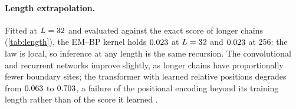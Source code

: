 \paragraph{Length extrapolation.}
Fitted at $L=32$ and evaluated against the exact score of longer chains
(\cref{tab:length}), the EM--BP kernel holds $0.023$ at $L=32$ and
$0.023$ at $256$: the law is local, so inference at any length is the same
recursion. The convolutional and recurrent networks improve slightly, as longer chains
have proportionally fewer boundary sites; the transformer with learned relative positions
degrades from $0.063$ to $0.703$, a failure of
the positional encoding beyond its training length rather than of the score it learned
\citep{press2022alibi,kazemnejad2023positional}.

